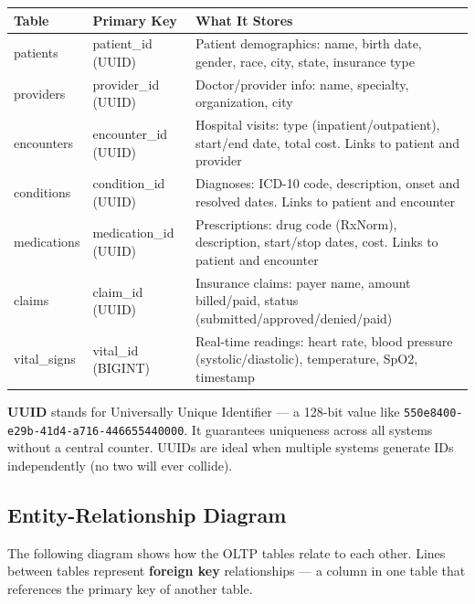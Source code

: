 \documentclass[12pt, a4paper, oneside]{report}
\begin{document}
\begin{longtable}{>{\ttfamily\small}p{2.5cm} p{2.5cm} p{8cm}}
    \toprule
    \normalfont\textbf{Table} & \textbf{Primary Key} & \textbf{What It Stores} \\
    \midrule
    \endhead
    patients & patient\_id (UUID) & Patient demographics: name, birth date, gender, race, city, state, insurance type \\
    providers & provider\_id (UUID) & Doctor/provider info: name, specialty, organization, city \\
    encounters & encounter\_id (UUID) & Hospital visits: type (inpatient/outpatient), start/end date, total cost. Links to patient and provider \\
    conditions & condition\_id (UUID) & Diagnoses: ICD-10 code, description, onset and resolved dates. Links to patient and encounter \\
    medications & medication\_id (UUID) & Prescriptions: drug code (RxNorm), description, start/stop dates, cost. Links to patient and encounter \\
    claims & claim\_id (UUID) & Insurance claims: payer name, amount billed/paid, status (submitted/approved/denied/paid) \\
    vital\_signs & vital\_id (BIGINT) & Real-time readings: heart rate, blood pressure (systolic/diastolic), temperature, SpO2, timestamp \\
    \bottomrule
\end{longtable}

\begin{tipbox}
    \textbf{UUID} stands for Universally Unique Identifier --- a 128-bit value like \texttt{550e8400-e29b-41d4-a716-446655440000}. It guarantees uniqueness across all systems without a central counter. UUIDs are ideal when multiple systems generate IDs independently (no two will ever collide).
\end{tipbox}

\subsection{Entity-Relationship Diagram}

The following diagram shows how the OLTP tables relate to each other. Lines between tables represent \textbf{foreign key} relationships --- a column in one table that references the primary key of another table.
\end{document}
